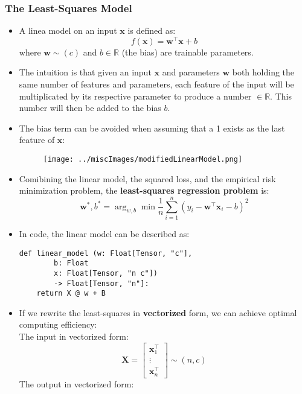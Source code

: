 \documentclass{article}
\newcommand{\tbf}[1]{\textbf{#1}}
\newcommand{\mbf}[1]{\mathbf{#1}}
\begin{document}
    \subsubsection{The Least-Squares Model}

    \begin{itemize}
        \item A linea model on an input $\mbf{x}$ is defined as:
        \[f(\mbf{x})= \mbf{w}^{\top}\mbf{x}+b\]
        where $\mbf{w} \sim (c)$ and $b \in \mathbb{R}$ (the bias) are trainable parameters.
        \item The intuition is that given an input $\mbf{x}$ and parameters $\mbf{w}$ both holding the same number of features and parameters,
        each feature of the input will be multiplicated by its respective parameter to produce a number $\in \mathbb{R}$. This number will then be 
        added to the bias $b$.
        \item The bias term can be avoided when assuming that a 1 exists as the last feature of $\mbf{x}$:
        \begin{figure}[h]
            \centering
            \texttt{[image: ../miscImages/modifiedLinearModel.png]} 
            \label{fig:example}
        \end{figure}
        \item Comibining the linear model, the squared loss, and the empirical risk minimization problem, the \tbf{least-squares regression problem} is:
        \[
        \mbf{w}^*,b^*= \arg_{w,b}\min \frac{1}{n} \sum^n_{i=1}(y_i-\mbf{w}^{\top}\mbf{x}_i-b)^2 
        \]
        \item In code, the linear model can be described as:
        \begin{lstlisting}
def linear_model (w: Float[Tensor, "c"],
        b: Float
        x: Float[Tensor, "n c"])
        -> Float[Tensor, "n"]:
    return X @ w + B
        \end{lstlisting}
        \item If we rewrite the least-squares in \tbf{vectorized} form, we can achieve optimal computing efficiency: \\
        The input in vectorized form:
        \[
        \mbf{X} = 
        \begin{bmatrix}
        \mbf{x}_1^{\top} \\
        \vdots \\
        \mbf{x}_n^{\top}
        \end{bmatrix}
        \sim (n,c)
        \]
        The output in vectorized form:

\end{itemize}
\end{document}
